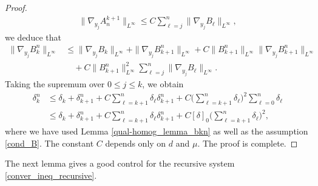 \documentclass[reqno,12pt]{amsart} %
\theoremstyle{definition}
\theoremstyle{remark}
\numberwithin{equation}{section}
\begin{document}
\begin{proof}
\begin{align*}
  \|\nabla_{y_j}A_n^{k+1}\|_{L^\infty}\leq C\sum_{\ell=j}^{n}\|\nabla_{y_j}B_\ell\|_{L^\infty},
\end{align*}
we deduce that
\begin{align*}
  \|\nabla_{y_j}B_{k}^n\|_{L^\infty}&\leq \|\nabla_{y_j}B_{k}\|_{L^\infty}+\|\nabla_{y_j}B_{k+1}^n\|_{L^\infty}+C\|B_{k+1}^n\|_{L^\infty}\|\nabla_{y_j}B_{k+1}^n\|_{L^\infty}\\&\quad+C\|B_{k+1}^n\|_{L^\infty}^2\sum_{\ell=j}^{n}\|\nabla_{y_j} B_\ell\|_{L^\infty}.
\end{align*}
Taking the supremum over $0\le j\le k$, we obtain 
  \begin{align*}
    \delta_{k}^{n}&\leq \delta_{k}+\delta_{k+1}^n+C\sum_{\ell=k+1}^n\delta_\ell\delta_{k+1}^n+C\bigg(\sum_{\ell=k+1}^n\delta_\ell\bigg)^2\sum_{\ell=0}^{n}\delta_\ell\\&\leq \delta_{k}+\delta_{k+1}^n+C\sum_{\ell=k+1}^n\delta_\ell\delta_{k+1}^n+C[\delta]_0\bigg(\sum_{\ell=k+1}^n\delta_\ell\bigg)^2,
  \end{align*}
  where we have used Lemma \ref{qual-homog_lemma_bkn} as well as the assumption \eqref{cond_B}. The constant $C$ depends only on $d$ and $\mu$. The proof is complete. 
\end{proof}

The next lemma gives a good control for the recursive system \eqref{conver_ineq_recursive}.
\end{document}
